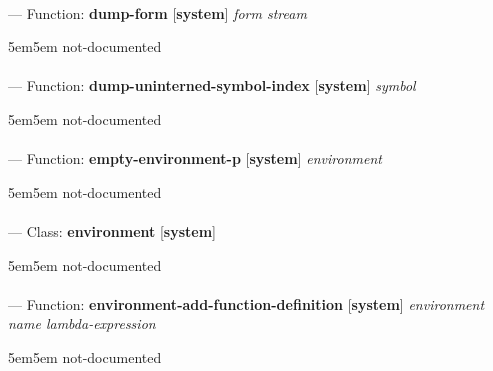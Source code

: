 \paragraph{}
\label{SYSTEM:DUMP-FORM}
--- Function: \textbf{dump-form} [\textbf{system}] \textit{form stream}

\begin{adjustwidth}{5em}{5em}
not-documented
\end{adjustwidth}

\paragraph{}
\label{SYSTEM:DUMP-UNINTERNED-SYMBOL-INDEX}
--- Function: \textbf{dump-uninterned-symbol-index} [\textbf{system}] \textit{symbol}

\begin{adjustwidth}{5em}{5em}
not-documented
\end{adjustwidth}

\paragraph{}
\label{SYSTEM:EMPTY-ENVIRONMENT-P}
--- Function: \textbf{empty-environment-p} [\textbf{system}] \textit{environment}

\begin{adjustwidth}{5em}{5em}
not-documented
\end{adjustwidth}

\paragraph{}
\label{SYSTEM:ENVIRONMENT}
--- Class: \textbf{environment} [\textbf{system}] \textit{}

\begin{adjustwidth}{5em}{5em}
not-documented
\end{adjustwidth}

\paragraph{}
\label{SYSTEM:ENVIRONMENT-ADD-FUNCTION-DEFINITION}
--- Function: \textbf{environment-add-function-definition} [\textbf{system}] \textit{environment name lambda-expression}

\begin{adjustwidth}{5em}{5em}
not-documented
\end{adjustwidth}

